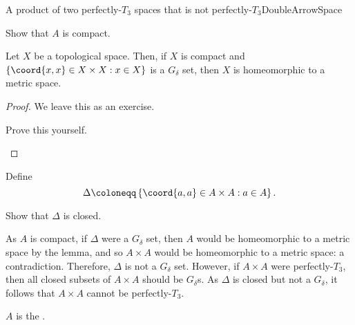 \begin{exm}{A product of two perfectly-$T_3$ spaces that is not perfectly-$T_3$}{DoubleArrowSpace}
\begin{exr}{}{}
Show that $A$ is compact.
\end{exr}
\begin{lma}{}{}
Let $X$ be a topological space.  Then, if $X$ is compact and $\left\{ \coord{x,x}\in X\times X:x\in X\right\}$ is a $G_{\delta}$ set, then $X$ is homeomorphic to a metric space.
\begin{proof}
We leave this as an exercise.
\begin{exr}{}{}
Prove this yourself.
\end{exr}
\end{proof}
\end{lma}
Define
\begin{equation}
\Delta \coloneqq \left\{ \coord{a,a}\in A\times A:a\in A\right\} .
\end{equation}
\begin{exr}{}{}
Show that $\Delta$ is closed.
\end{exr}
As $A$ is compact, if $\Delta$ were a $G_{\delta}$ set, then $A$ would be homeomorphic to a metric space by the lemma, and so $A\times A$ would be homeomorphic to a metric space:  a contradiction.  Therefore, $\Delta$ is not a $G_{\delta}$ set.  However, if $A\times A$ were perfectly-$T_3$, then all closed subsets of $A\times A$ should be $G_{\delta}$s.  As $\Delta$ is closed but not a $G_{\delta}$, it follows that $A\times A$ cannot be perfectly-$T_3$.
\begin{rmk}
$A$ is the .
\end{rmk}
\end{exm}

